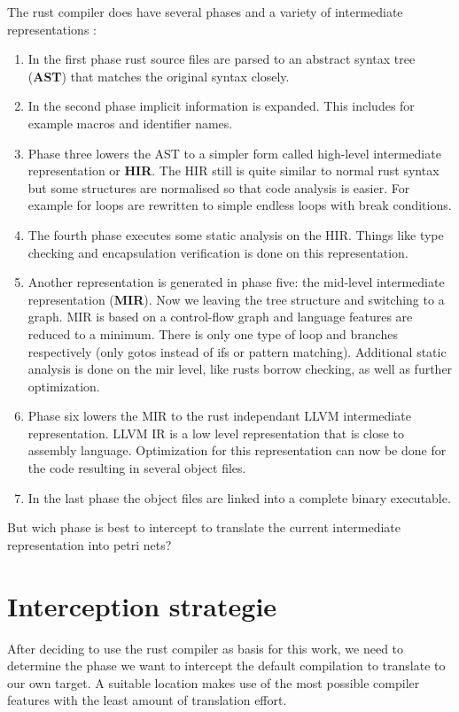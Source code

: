 The rust compiler does have several phases and a variety of intermediate representations \cite[Chapter 2.1]{rustc-guide}:
\begin{enumerate}
    \item In the first phase rust source files are parsed to an abstract syntax tree (\textbf{AST}) that matches the original syntax closely.
    \item In the second phase implicit information is expanded. This includes for example macros and identifier names.
    \item Phase three lowers the AST to a simpler form called high-level intermediate representation or \textbf{HIR}.
    The HIR still is quite similar to normal rust syntax but some structures are normalised so that code analysis is easier. 
    For example for loops are rewritten to simple endless loops with break conditions.
    \item The fourth phase executes some static analysis on the HIR.
    Things like type checking and encapsulation verification is done on this representation.
    \item Another representation is generated in phase five: the mid-level intermediate representation (\textbf{MIR}).
    Now we leaving the tree structure and switching to a graph.
    MIR is based on a control-flow graph \cite{} and language features are reduced to a minimum.
    There is only one type of loop and branches respectively (only gotos instead of ifs or pattern matching).
    Additional static analysis is done on the mir level,
    like rusts borrow checking, as well as further optimization.
    \item Phase six lowers the MIR to the rust independant LLVM\cite{} intermediate representation.
    LLVM IR is a low level representation that is close to assembly language.
    Optimization for this representation can now be done for the code resulting in several object files.
    \item In the last phase the object files are linked into a complete binary executable.
\end{enumerate}
But wich phase is best to intercept to translate the current intermediate representation into petri nets?

\section{Interception strategie}
\label{app_intercept}
After deciding to use the rust compiler as basis for this work, we need to determine the phase we want to intercept the default compilation to translate to our own target.
A suitable location makes use of the most possible compiler features with the least amount of translation effort.

